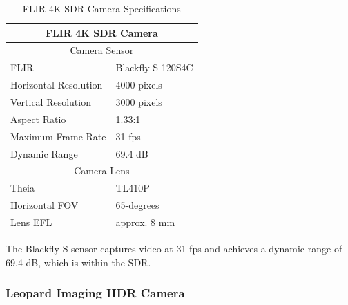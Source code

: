 \documentclass{erauthesis}
\begin{document}
\begin{table}[htbp]
\centering
\begin{tabular}{ll}
\hline
\multicolumn{2}{c}{FLIR 4K SDR Camera}\\
\hline
\hline
\multicolumn{2}{c}{Camera Sensor}\\
\hline
FLIR & Blackfly S 120S4C \\
Horizontal Resolution & 4000 pixels \\
Vertical Resolution & 3000 pixels \\
Aspect Ratio & 1.33:1 \\
Maximum Frame Rate & 31 fps \\
Dynamic Range & 69.4 dB \\
\multicolumn{2}{c}{Camera Lens}\\
\hline
Theia & TL410P\\
Horizontal \Ac{FOV} & 65-degrees\\
Lens \Ac{EFL} & approx. 8 mm\\
\hline
\end{tabular}
\caption{FLIR 4K SDR Camera Specifications}
\label{table:SDR_camera_specs}
\end{table}

The Blackfly S sensor captures video at 31 \ac{fps} and achieves a dynamic range of 69.4 dB, which is within the \ac{SDR}.

\subsubsection{Leopard Imaging HDR Camera} \label{sensors_HDR}
\end{document}
